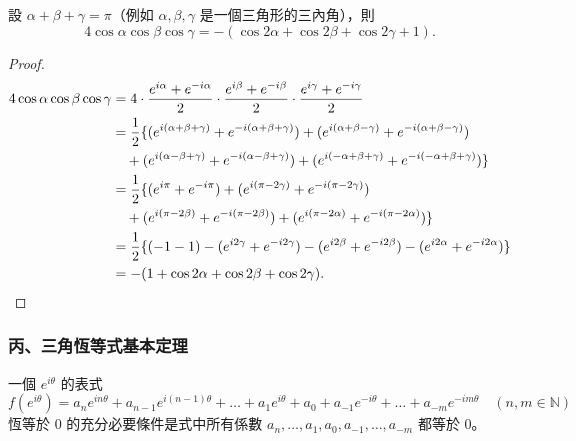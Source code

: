 \begin{example}
設 $\alpha+\beta+\gamma = \pi$（例如 $\alpha, \beta, \gamma$ 是一個三角形的三內角），則
\[
4\cos\alpha\cos\beta\cos\gamma = -(\cos 2\alpha+\cos 2\beta+\cos 2\gamma+1).
\]
\end{example}

\begin{proof}
\begin{align*}
4\cos\alpha\cos\beta\cos\gamma &= 4\cdot\frac{e^{i\alpha}+e^{-i\alpha}}{2}\cdot\frac{e^{i\beta}+e^{-i\beta}}{2}\cdot\frac{e^{i\gamma}+e^{-i\gamma}}{2} \\
&= \frac{1}{2}\{(e^{i(\alpha+\beta+\gamma)}+e^{-i(\alpha+\beta+\gamma)}) + (e^{i(\alpha+\beta-\gamma)}+e^{-i(\alpha+\beta-\gamma)}) \\
&\quad + (e^{i(\alpha-\beta+\gamma)}+e^{-i(\alpha-\beta+\gamma)}) + (e^{i(-\alpha+\beta+\gamma)}+e^{-i(-\alpha+\beta+\gamma)})\} \\
&= \frac{1}{2}\{(e^{i\pi}+e^{-i\pi}) + (e^{i(\pi-2\gamma)}+e^{-i(\pi-2\gamma)}) \\
&\quad + (e^{i(\pi-2\beta)}+e^{-i(\pi-2\beta)}) + (e^{i(\pi-2\alpha)}+e^{-i(\pi-2\alpha)})\} \\
&= \frac{1}{2}\{(-1-1) - (e^{i 2\gamma}+e^{-i 2\gamma}) - (e^{i 2\beta}+e^{-i 2\beta}) - (e^{i 2\alpha}+e^{-i 2\alpha})\} \\
&= -(1+\cos 2\alpha+\cos 2\beta+\cos 2\gamma). \qedhere
\end{align*}
\end{proof}

\subsubsection*{丙、三角恆等式基本定理}

\begin{theorem}[定理 I]
一個 $e^{i\theta}$ 的表式
\[
f(e^{i\theta}) = a_n e^{in\theta} + a_{n-1} e^{i(n-1)\theta} + \dots + a_1 e^{i\theta} + a_0 + a_{-1}e^{-i\theta} + \dots + a_{-m}e^{-im\theta} \quad (n, m \in \mathbb{N})
\]
恆等於 $0$ 的充分必要條件是式中所有係數 $a_n, \dots, a_1, a_0, a_{-1}, \dots, a_{-m}$ 都等於 $0$。
\end{theorem}

